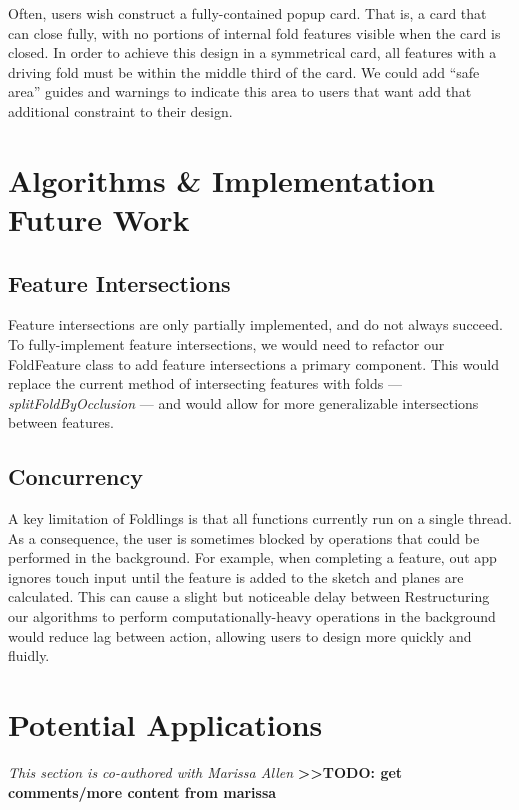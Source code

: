 Often, users wish construct a fully-contained popup card. That is, a
card that can close fully, with no portions of internal fold features
visible when the card is closed. In order to achieve this design in a
symmetrical card, all features with a driving fold must be within the
middle third of the card. We could add ``safe area'' guides and warnings
to indicate this area to users that want add that additional constraint
to their design.

\section{Algorithms \& Implementation Future
Work}\label{algorithms-implementation-future-work}

\subsection{Feature Intersections}\label{feature-intersections}

Feature intersections are only partially implemented, and do not always
succeed. To fully-implement feature intersections, we would need to
refactor our FoldFeature class to add feature intersections a primary
component. This would replace the current method of intersecting
features with folds --- \emph{splitFoldByOcclusion} --- and would allow
for more generalizable intersections between features.

\subsection{Concurrency}\label{concurrency}

A key limitation of Foldlings is that all functions currently run on a
single thread. As a consequence, the user is sometimes blocked by
operations that could be performed in the background. For example, when
completing a feature, out app ignores touch input until the feature is
added to the sketch and planes are calculated. This can cause a slight
but noticeable delay between Restructuring our algorithms to perform
computationally-heavy operations in the background would reduce lag
between action, allowing users to design more quickly and fluidly.

\section{Potential Applications}\label{potential-applications}

\emph{This section is co-authored with Marissa Allen}
\textbf{\textgreater{}\textgreater{}TODO: get comments/more content from
marissa}


